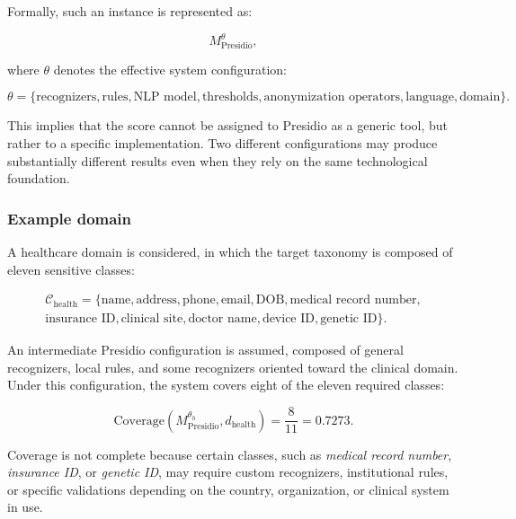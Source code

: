 \documentclass[11pt,a4paper]{article}
\begin{document}
Formally, such an instance is represented as:

\begin{equation}
M_{\mathrm{Presidio}}^{\theta},
\end{equation}

where \(\theta\) denotes the effective system configuration:

\begin{equation}
\theta =
\{
\text{recognizers},
\text{rules},
\text{NLP model},
\text{thresholds},
\text{anonymization operators},
\text{language},
\text{domain}
\}.
\end{equation}

This implies that the score cannot be assigned to Presidio as a generic tool, but rather to a specific implementation. Two different configurations may produce substantially different results even when they rely on the same technological foundation.

\subsubsection{Example domain}

A healthcare domain is considered, in which the target taxonomy is composed of eleven sensitive classes:

\begin{equation}
\begin{aligned}
\mathcal{C}_{\mathrm{health}} =
\{
\text{name},
\text{address},
\text{phone},
\text{email},
\text{DOB},
\text{medical record number}, \\
\text{insurance ID},
\text{clinical site},
\text{doctor name},
\text{device ID},
\text{genetic ID}
\}.
\end{aligned}
\end{equation}

An intermediate Presidio configuration is assumed, composed of general recognizers, local rules, and some recognizers oriented toward the clinical domain. Under this configuration, the system covers eight of the eleven required classes:

\begin{equation}
\mathrm{Coverage}
\left(
M_{\mathrm{Presidio}}^{\theta_h},
d_{\mathrm{health}}
\right)
=
\frac{8}{11}
=
0.7273.
\end{equation}

Coverage is not complete because certain classes, such as \textit{medical record number}, \textit{insurance ID}, or \textit{genetic ID}, may require custom recognizers, institutional rules, or specific validations depending on the country, organization, or clinical system in use.
\end{document}
